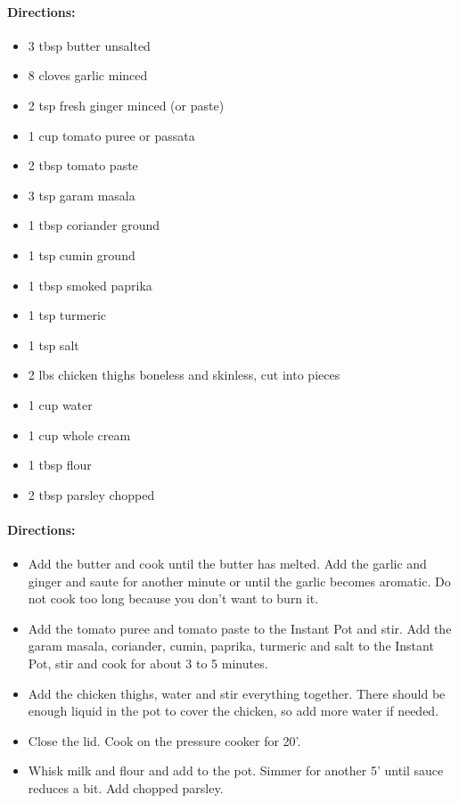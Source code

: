 \documentclass{article}
\begin{document}
\paragraph{Directions:}
\begin{itemize}
	\item 3 tbsp butter unsalted
	\item 8 cloves garlic minced
	\item 2 tsp fresh ginger minced (or paste)
	\item 1 cup tomato puree or passata
	\item 2 tbsp tomato paste
	\item 3 tsp garam masala
	\item 1 tbsp coriander ground
	\item 1 tsp cumin ground
	\item 1 tbsp smoked paprika
	\item 1 tsp turmeric
	\item 1 tsp salt
	\item 2 lbs chicken thighs boneless and skinless, cut into pieces
	\item 1 cup water
	\item 1 cup whole cream
	\item 1 tbsp flour
	\item 2 tbsp parsley chopped	
\end{itemize}

\paragraph{Directions:}
\begin{itemize}
	\item Add the butter and cook until the butter has melted. Add the garlic and ginger and saute for another
	minute or until the garlic becomes aromatic. Do not cook too long because you don’t want to burn it.
	\item Add the tomato puree and tomato paste to the Instant Pot and stir. Add the garam masala, coriander,
	cumin, paprika, turmeric and salt to the Instant Pot, stir and cook for about 3 to 5 minutes.
	\item Add the chicken thighs, water and stir everything together. There should be enough liquid in the pot to
	cover the chicken, so add more water if needed.
	\item Close the lid. Cook on the pressure cooker for 20’.
	\item Whisk milk and flour and add to the pot. Simmer for another 5’ until sauce reduces a bit. Add chopped
	parsley.	
\end{itemize}
\end{document}
